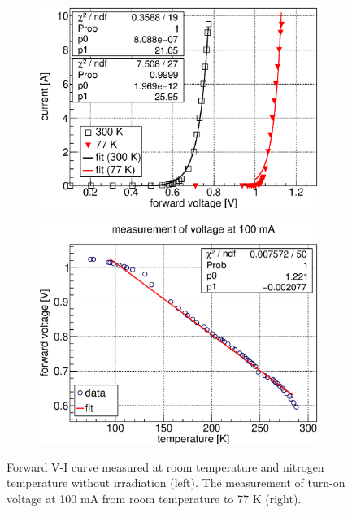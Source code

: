  \begin{figure}[H]
  \begin{subfigure}{0.3\textwidth}
   \centering
   \includegraphics[scale=0.43]{chapter4/fig/cryo.eps}
  \end{subfigure}
  \hspace{0.2\textwidth}
  \begin{subfigure}{0.3\textwidth}
   \centering
   \includegraphics[scale=0.43]{chapter4/fig/temp.eps}
  \end{subfigure}
  \caption{Forward V-I curve measured at room temperature and nitrogen temperature without irradiation (left). The measurement of turn-on voltage at 100 mA from room temperature to 77 K (right).}
  \label{3cryo}
 \end{figure}


